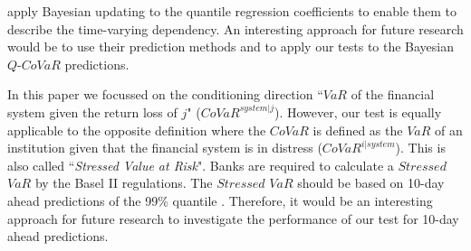 \documentclass[12pt]{article}
\begin{document}
\citet{bayesian} apply Bayesian updating to the quantile regression coefficients to enable them to describe the time-varying dependency. An interesting approach for future research would be to use their prediction methods and to apply our tests to the Bayesian $Q$-$CoVaR$ predictions.

In this paper we focussed on the conditioning direction ``$VaR$ of the financial system given the return loss of $j$" ($CoVaR^{system|j}$). However, our test is equally applicable to the opposite definition where the $CoVaR$ is defined as the $VaR$ of an institution given that the financial system is in distress ($CoVaR^{i|system}$). This is also called ``\textit{Stressed Value at Risk}". Banks are required to calculate a $Stressed$ $VaR$ by the Basel II regulations. The $Stressed$ $VaR$ should be based on 10-day ahead predictions of the 99\% quantile \citep[][p. 14]{baselii}. Therefore, it would be an interesting approach for future research to investigate the performance of our test for 10-day ahead predictions.








\end{document}
